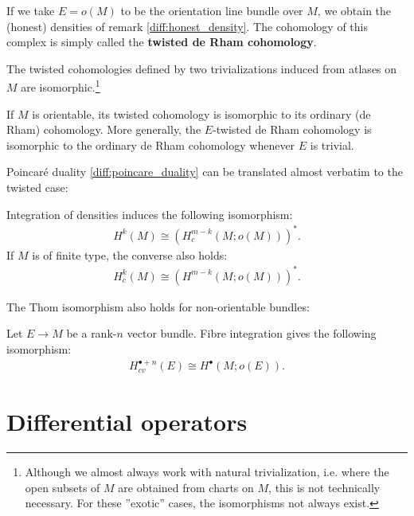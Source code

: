     If we take $E=o(M)$ to be the orientation line bundle over $M$, we obtain the (honest) densities of remark \ref{diff:honest_density}. The cohomology of this complex is simply called the \textbf{twisted de Rham cohomology}.
    \begin{property}[Isomorphisms]
        The twisted cohomologies defined by two trivializations induced from atlases on $M$ are isomorphic.\footnote{Although we almost always work with natural trivialization, i.e. where the open subsets of $M$ are obtained from charts on $M$, this is not technically necessary. For these ''exotic'' cases, the isomorphisms not always exist.}
    \end{property}
    \begin{property}
        If $M$ is orientable, its twisted cohomology is isomorphic to its ordinary (de Rham) cohomology. More generally, the $E$-twisted de Rham cohomology is isomorphic to the ordinary de Rham cohomology whenever $E$ is trivial.
    \end{property}

    Poincar\'e duality \ref{diff:poincare_duality} can be translated almost verbatim to the twisted case:
    \begin{theorem}
        Integration of densities induces the following isomorphism:
        \begin{gather}
            H^k(M)\cong\left(H^{m-k}_c(M; o(M))\right)^*.
        \end{gather}
        If $M$ is of finite type, the converse also holds:
        \begin{gather}
            H^k_c(M)\cong\left(H^{m-k}(M; o(M))\right)^*.
        \end{gather}
    \end{theorem}
    The Thom isomorphism also holds for non-orientable bundles:
    \begin{theorem}
        Let $E\rightarrow M$ be a rank-$n$ vector bundle. Fibre integration gives the following isomorphism:
        \begin{gather}
            H^{\bullet+n}_{cv}(E)\cong H^\bullet(M; o(E)).
        \end{gather}
    \end{theorem}

\section{Differential operators}

